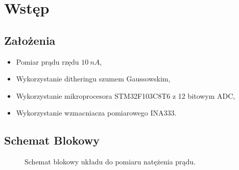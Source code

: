 \section{Wstęp}
    \subsection{Założenia}
        \begin{itemize}
            \item Pomiar prądu rzędu $10\ nA$,
            \item Wykorzystanie ditheringu szumem Gaussowskim, 
            \item Wykorzystanie mikroprocesora STM32F103C8T6 z 12 bitowym ADC,
            \item Wykorzystanie wzmacniacza pomiarowego INA333.
        \end{itemize}
    \subsection{Schemat Blokowy}
    \begin{figure}[!ht]
        \centering
        \scalebox{1}{}
        \caption{Schemat blokowy układu do pomiaru natężenia prądu.}
        \label{sch:BD}
    \end{figure}